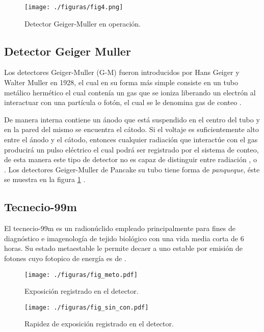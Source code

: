 \begin{multicols}{2}
  \begin{figure}[H]
    \centering
    \texttt{[image: ./figuras/fig4.png]}
    \caption{Detector Geiger-Muller en operación.}
    \label{fig:gm}
  \end{figure}



  \subsection*{Detector Geiger Muller}




Los detectores Geiger-Muller (G-M) fueron introducidos por Hans Geiger y Walter Muller en 1928, el cual en su forma más simple consiste en un tubo metálico hermético el cual contenía un gas que se ioniza liberando un electrón al interactuar con una partícula o fotón, el cual se le denomina gas de conteo \citep{detec2}. 

De manera interna contiene un ánodo que está suspendido en el centro del tubo y en la pared del mismo se encuentra el cátodo. Si el voltaje es suficientemente alto entre el ánodo y el cátodo, entonces cualquier radiación que interactúe con el gas producirá un pulso eléctrico el cual podrá ser registrado por el sistema de conteo, de esta manera este tipo de detector no es capaz de distinguir entre radiación \ec{\alpha}, \ec{\beta} o \ec{\gamma}. Los detectores Geiger-Muller de Pancake su tubo tiene forma de \textit{panqueque}, éste se muestra en la figura \ref{fig:gm}  \citep{detec1,detec2}. 
 
\subsection*{Tecnecio-99m}

El tecnecio-99m es un radionúclido empleado principalmente para fines de diagnóstico e imagenología de tejido biológico con una vida media corta de 6 horas. Su estado metaestable le permite decaer a uno estable por emisión de fotones cuyo fotopico de energía es de  \citep{tc99m}.



\begin{figure*}[hbt]
  \centering
  \texttt{[image: ./figuras/fig\_meto.pdf]}
  \caption{Exposición registrado en el detector.}
  \label{fig:meto}
\end{figure*}

\begin{figure*}[hbb]
  \centering
  \texttt{[image: ./figuras/fig\_sin\_con.pdf]}
  \caption{Rapidez de exposición  registrado en el detector.}
  \label{fig:pract_03_con_sin}
\end{figure*}


\end{multicols}
